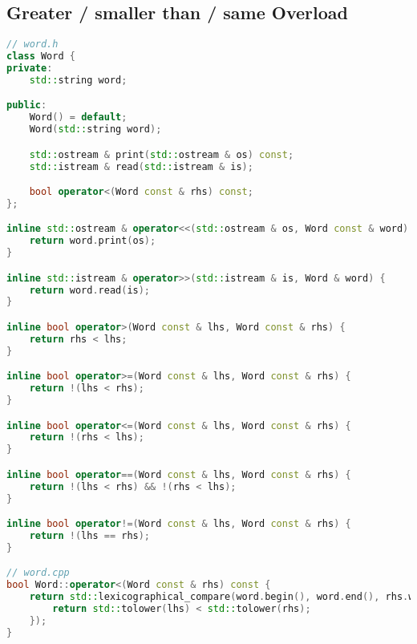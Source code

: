 \subsection{Greater / smaller than / same Overload}
\begin{lstlisting}[language=C++]
// word.h
class Word {
private:
	std::string word;

public:
	Word() = default;
	Word(std::string word);

	std::ostream & print(std::ostream & os) const;
	std::istream & read(std::istream & is);

	bool operator<(Word const & rhs) const;
};

inline std::ostream & operator<<(std::ostream & os, Word const & word) {
	return word.print(os);
}

inline std::istream & operator>>(std::istream & is, Word & word) {
	return word.read(is);
}

inline bool operator>(Word const & lhs, Word const & rhs) {
	return rhs < lhs;
}

inline bool operator>=(Word const & lhs, Word const & rhs) {
	return !(lhs < rhs);
}

inline bool operator<=(Word const & lhs, Word const & rhs) {
	return !(rhs < lhs);
}

inline bool operator==(Word const & lhs, Word const & rhs) {
	return !(lhs < rhs) && !(rhs < lhs);
}

inline bool operator!=(Word const & lhs, Word const & rhs) {
	return !(lhs == rhs);
}

// word.cpp
bool Word::operator<(Word const & rhs) const {
	return std::lexicographical_compare(word.begin(), word.end(), rhs.word.begin() ,rhs.word.end(), [](char lhs, char rhs) {
		return std::tolower(lhs) < std::tolower(rhs);
	});
}
\end{lstlisting}
